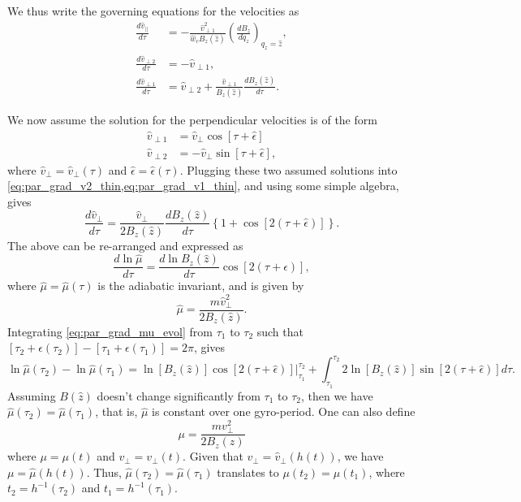 \documentclass[oneside,a4paper,11pt]{report}
\begin{document}
We thus write the governing equations for the velocities as
\begin{align}
    \frac{d\hat{v}_{||}}{d\tau} &= -\frac{\hat{v}^2_{\perp1}}{\hat{w}_c B_z(\hat{z})} \left ( \frac{dB_z}{dq_z} \right)_{q_z = \hat{z}} ,\label{eq:par_grad_vpar_thin}\\
    \frac{d\hat{v}_{\perp2}}{d\tau} &= -\hat{v}_{\perp1}, \label{eq:par_grad_v2_thin} \\
    \frac{d\hat{v}_{\perp1}}{d\tau} &= \hat{v}_{\perp2} + \frac{\hat{v}_{\perp1}}{B_z(\hat{z})} \frac{dB_z(\hat{z})}{d\tau}. \label{eq:par_grad_v1_thin}
\end{align}

We now assume the solution for the perpendicular velocities is of the form
\begin{align}
    \hat{v}_{\perp1} &= \hat{v}_\perp \cos [\tau + \hat{\epsilon}] \\
    \hat{v}_{\perp2} &= -\hat{v}_\perp \sin [\tau + \hat{\epsilon}],
\end{align}
where $\hat{v}_\perp = \hat{v}_\perp(\tau)$ and $\hat{\epsilon} = \hat{\epsilon}(\tau)$. Plugging these two assumed solutions into \cref{eq:par_grad_v2_thin,eq:par_grad_v1_thin}, and using some simple algebra, gives
\begin{equation}
    \frac{d\hat{v}_\perp}{d\tau} = \frac{\hat{v}_\perp}{2 B_z(\hat{z})} \frac{dB_z(\hat{z})}{d\tau} \left \{ 1 + \cos [2 (\tau + \hat{\epsilon})] \right \}.
\end{equation}
The above can be re-arranged and expressed as
\begin{equation}
\label{eq:par_grad_mu_evol}
    \frac{d \ln \hat{\mu}}{d\tau} = \frac{d \ln B_z(\hat{z}) }{d\tau} \cos [2 (\tau + \hat{\epsilon})],
\end{equation}
where $\hat{\mu} = \hat{\mu}(\tau)$ is the adiabatic invariant, and is given by
\begin{equation}
    \hat{\mu} = \frac{m \hat{v}^2_\perp}{2 B_z(\hat{z})}.
\end{equation}
Integrating \cref{eq:par_grad_mu_evol} from $\tau_1$ to $\tau_2$ such that $[\tau_2 + \epsilon(\tau_2)] - [\tau_1 + \epsilon(\tau_1)] = 2 \pi$, gives
\begin{equation}
    \ln \hat{\mu}(\tau_2) - \ln \hat{\mu}(\tau_1) = \left . \ln [B_z(\hat{z})] \cos [2(\tau + \hat{\epsilon})] \right |^{\tau_2}_{\tau_1} + \int_{\tau_1}^{\tau_2} 2 \ln [ B_z(\hat{z}) ] \sin [2(\tau + \hat{\epsilon})] d\tau.
\end{equation}
Assuming $B(\hat{z})$ doesn't change significantly from $\tau_1$ to $\tau_2$, then we have $\hat{\mu}(\tau_2) = \hat{\mu}(\tau_1)$, that is, $\hat{\mu}$ is constant over one gyro-period. One can also define
\begin{equation}
    \mu = \frac{m v_\perp^2}{2B_z(z)}
\end{equation}
where $\mu = \mu(t)$ and $v_\perp = v_\perp(t)$. Given that $v_\perp = \hat{v}_\perp(h(t))$, we have $\mu = \hat{\mu}(h(t))$. Thus, $\hat{\mu}(\tau_2) = \hat{\mu}(\tau_1)$ translates to $\mu(t_2) = \mu(t_1)$, where $t_2 = h^{-1}(\tau_2)$ and $t_1 = h^{-1}(\tau_1)$.
\end{document}
